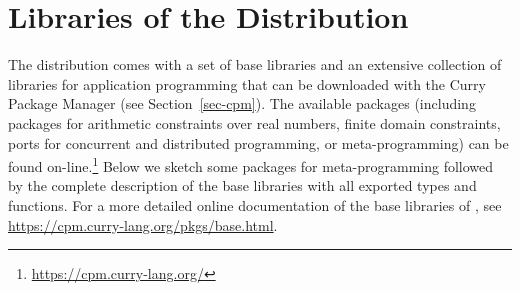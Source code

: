 \section{Libraries of the \CYS Distribution}
\label{sec:libraries}

{\setlength{\parindent}{0.0cm}

The \CYS distribution comes with a set of base libraries
and an extensive collection of libraries for application programming
that can be downloaded with the Curry Package Manager
(see Section~\ref{sec-cpm}).
The available packages (including packages
for arithmetic constraints over real numbers,
finite domain constraints,
ports for concurrent and distributed programming, or
meta-programming) can be found on-line.\footnote{%
\url{https://cpm.curry-lang.org/}}
Below we sketch some packages for meta-programming
followed by the complete description of the base libraries
with all exported types and functions.
For a more detailed online documentation of the base libraries of \CYS,
see \url{https://cpm.curry-lang.org/pkgs/base.html}.

}
